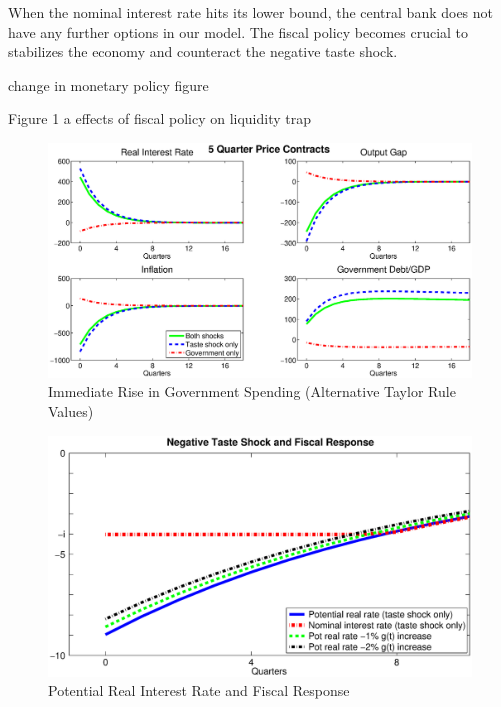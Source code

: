 \documentclass[12pt,a4paper,oneside,titlepage]{article}
\begin{document}
When the nominal interest rate hits its lower bound, the central bank does not have any further options in our model. The fiscal policy becomes crucial to stabilizes the economy and counteract the negative taste shock.

change in monetary policy figure

Figure 1 a effects of fiscal policy on liquidity trap

\begin{figure}[p]
\includegraphics[width=\textwidth]{Paperpics/Figure25quarternewtaylorrule}
\caption{Immediate Rise in Government Spending (Alternative Taylor Rule Values)}
\label{IR5quarternewtr}
\end{figure}
\bigskip

\begin{figure}[p]
\includegraphics[width=\textwidth]{Paperpics/Figure1a}
\caption{Potential Real Interest Rate and Fiscal Response}
\label{Figure1a}
\end{figure}





\end{document}
